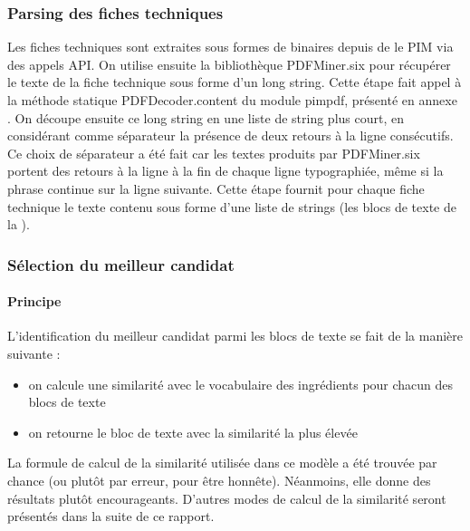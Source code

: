             \subsubsection{Parsing des fiches techniques}

                Les fiches techniques sont extraites sous formes de binaires depuis de le PIM via des appels API.
                On utilise ensuite la bibliothèque PDFMiner.six pour récupérer le texte de la fiche technique sous forme d'un long string.
                Cette étape fait appel à la méthode statique PDFDecoder.content du module pimpdf, présenté en annexe .
                On découpe ensuite ce long string en une liste de string plus court, en considérant comme séparateur la présence de deux retours à la ligne consécutifs.
                Ce choix de séparateur a été fait car les textes produits par PDFMiner.six portent des retours à la ligne à la fin de chaque ligne typographiée, même si la phrase continue sur la ligne suivante.
                Cette étape fournit pour chaque fiche technique le texte contenu sous forme d'une liste de strings (les blocs de texte de la ).

            \subsubsection{Sélection du meilleur candidat}
            \label{open_model_similarity}

                \paragraph{Principe}
                L'identification du meilleur candidat parmi les blocs de texte se fait de la manière suivante :
                \begin{itemize}
                    \item on calcule une similarité avec le vocabulaire des ingrédients pour chacun des blocs de texte
                    \item on retourne le bloc de texte avec la similarité la plus élevée
                \end{itemize}
                La formule de calcul de la similarité utilisée dans ce modèle a été trouvée par chance (ou plutôt par erreur, pour être honnête).
                Néanmoins, elle donne des résultats plutôt encourageants.
                D'autres modes de calcul de la similarité seront présentés dans la suite de ce rapport.

